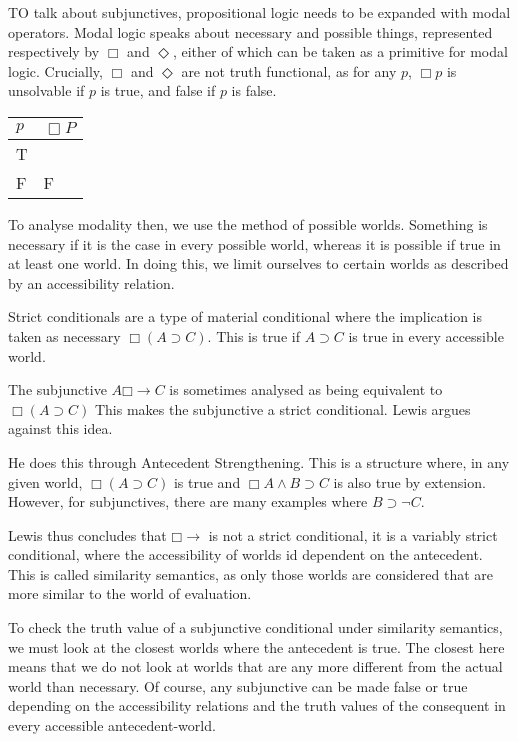 \documentclass[12pt]{report}
\newcommand{\would}{{\mathbin{\Box}{\rightarrow}}}
\begin{document}
TO talk about subjunctives, propositional logic needs to be expanded with modal
operators. Modal logic speaks about necessary and possible things, represented
respectively by $\Box$ and $\Diamond$, either of which can be taken as a
primitive for modal logic. Crucially, $\Box$ and $\Diamond$ are not truth
functional, as for any $p$, $\Box p$ is unsolvable if $p$ is true, and false if
$p$ is false.

\begin{tabular}{l|l}
$p$ & $\Box P$ \\
\hline
T & \\
F & F\\
\end{tabular}

To analyse modality then, we use the method of possible worlds. Something is
necessary if it is the case in every possible world, whereas it is possible if
true in at least one world. In doing this, we limit ourselves to certain worlds
as described by an accessibility relation. 

Strict conditionals are a type of material conditional where the implication is
taken as necessary $\Box(A \supset C)$. This is true if $A \supset C$ is true in
every accessible world.

The subjunctive $A \would C$ is sometimes analysed as being equivalent to $\Box
(A \supset C)$ This makes the subjunctive a strict conditional. Lewis argues
against this idea. 

He does this through Antecedent Strengthening. This is a structure where, in any
given world, $\Box(A \supset C)$ is true and $\Box A \land B \supset C$ is also
true by extension. However, for subjunctives, there are many examples where $B
\supset \lnot C$.

Lewis thus concludes that $\would$ is not a strict conditional, it is a variably
strict conditional, where the accessibility of worlds id dependent on the
antecedent. This is called similarity semantics, as only those worlds are
considered that are more similar to the world of evaluation.

To check the truth value of a subjunctive conditional under similarity
semantics, we must look at the closest worlds where the antecedent is true. The
closest here means that we do not look at worlds that are any more different
from the actual world than necessary. Of course, any subjunctive can be made
false or true depending on the accessibility relations and the truth values of
the consequent in every accessible antecedent-world.
\end{document}
